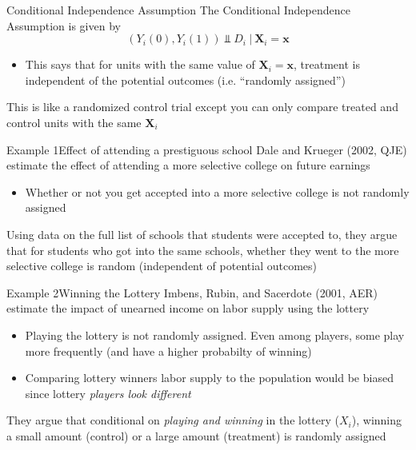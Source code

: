 \documentclass[aspectratio=169,t,11pt,table]{beamer}
\begin{document}
\begin{frame}{Conditional Independence Assumption}
  The \alert{Conditional Independence Assumption} is given by
  $$
    (Y_{i}(0), Y_{i}(1)) \Perp D_i \ \vert \ \bm{X}_i = \bm{x}
  $$
  \begin{itemize}
    \item This says that for units with the same value of $\bm{X}_i = \bm{x}$, treatment is independent of the potential outcomes (i.e. ``randomly assigned'')
  \end{itemize}

  \pause
  \bigskip
  This is like a randomized control trial except you can only compare treated and control units with the same $\bm{X}_i$
\end{frame}

\begin{frame}{Example 1}{Effect of attending a prestiguous school}
  Dale and Krueger (2002, QJE) estimate the effect of attending a more selective college on future earnings
  \begin{itemize}
    \item Whether or not you get accepted into a more selective college is not randomly assigned
  \end{itemize}

  \pause
  \bigskip
  Using data on the full list of schools that students were accepted to, they argue that for students who got into the same schools, whether they went to the more selective college is random (independent of potential outcomes)
\end{frame}

\begin{frame}{Example 2}{Winning the Lottery}
  Imbens, Rubin, and Sacerdote (2001, AER) estimate the impact of unearned income on labor supply using the lottery
  \begin{itemize}
    \item Playing the lottery is not randomly assigned. Even among players, some play more frequently (and have a higher probabilty of winning)
    
    \item Comparing lottery winners labor supply to the population would be biased since lottery \emph{players look different}
  \end{itemize}
  
  \pause
  \bigskip
  They argue that conditional on \emph{playing and winning} in the lottery ($X_i$), winning a small amount (control) or a large amount (treatment) is randomly assigned
\end{frame}
\end{document}
